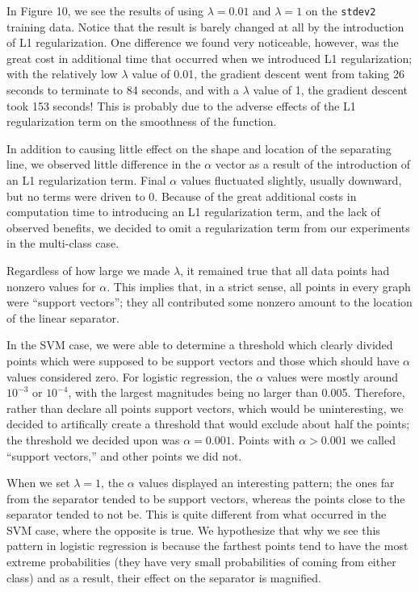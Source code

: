 \documentclass{sigchi}
\begin{document}
In Figure 10, we see the results of using $\lambda = 0.01$ and $\lambda = 1$ on the \texttt{stdev2} training data. Notice that the result is barely changed at all by the introduction of L1 regularization. One difference we found very noticeable, however, was the great cost in additional time that occurred when we introduced L1 regularization; with the relatively low $\lambda$ value of 0.01, the gradient descent went from taking 26 seconds to terminate to 84 seconds, and with a $\lambda$ value of 1, the gradient descent took 153 seconds! This is probably due to the adverse effects of the L1 regularization term on the smoothness of the function. 

In addition to causing little effect on the shape and location of the separating line, we observed little difference in the $\alpha$ vector as a result of the introduction of an L1 regularization term. Final $\alpha$ values fluctuated slightly, usually downward, but no terms were driven to 0. Because of the great additional costs in computation time to introducing an L1 regularization term, and the lack of observed benefits, we decided to omit a regularization term from our experiments in the multi-class case. 

Regardless of how large we made $\lambda$, it remained true that all data points had nonzero values for $\alpha$. This implies that, in a strict sense, all points in every graph were ``support vectors''; they all contributed some nonzero amount to the location of the linear separator.

In the SVM case, we were able to determine a threshold which clearly divided points which were supposed to be support vectors and those which should have $\alpha$ values considered zero. For logistic regression, the $\alpha$ values were mostly around $10^{-3}$ or $10^{-4}$, with the largest magnitudes being no larger than 0.005. Therefore, rather than declare all points support vectors, which would be uninteresting, we decided to artifically create a threshold that would exclude about half the points; the threshold we decided upon was $\alpha = 0.001$. Points with $\alpha > 0.001$ we called ``support vectors,'' and other points we did not.

When we set $\lambda = 1$, the $\alpha$ values displayed an interesting pattern; the ones far from the separator tended to be support vectors, whereas the points close to the separator tended to not be. This is quite different from what occurred in the SVM case, where the opposite is true. We hypothesize that why we see this pattern in logistic regression is because the farthest points tend to have the most extreme probabilities (they have very small probabilities of coming from either class) and as a result, their effect on the separator is magnified.
\end{document}
